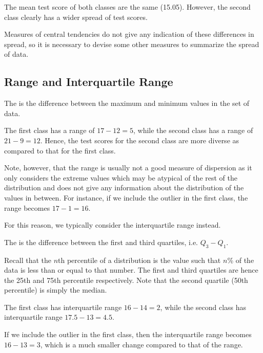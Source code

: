 The mean test score of both classes are the same (15.05). However, the second class clearly has a wider spread of test scores.

Measures of central tendencies do not give any indication of these differences in spread, so it is necessary to devise some other measures to summarize the spread of data.

\subsection{Range and Interquartile Range}

\begin{definition}
    The  is the difference between the maximum and minimum values in the set of data.
\end{definition}

\begin{example}[Range]
    The first class has a range of $17 - 12 = 5$, while the second class has a range of $21 - 9 = 12$. Hence, the test scores for the second class are more diverse as compared to that for the first class.
\end{example}

Note, however, that the range is usually not a good measure of dispersion as it only considers the extreme values which may be atypical of the rest of the distribution and does not give any information about the distribution of the values in between. For instance, if we include the outlier in the first class, the range becomes $17 - 1 = 16$.

For this reason, we typically consider the interquartile range instead.

\begin{definition}
    The  is the difference between the first and third quartiles, i.e. $Q_3 - Q_1$.
\end{definition}

Recall that the $n$th percentile of a distribution is the value such that $n$\% of the data is less than or equal to that number. The first and third quartiles are hence the 25th and 75th percentile respectively. Note that the second quartile (50th percentile) is simply the median.

\begin{example}
    The first class has interquartile range $16 - 14 = 2$, while the second class has interquartile range $17.5 - 13 = 4.5$.
    
    If we include the outlier in the first class, then the interquartile range becomes $16 - 13 = 3$, which is a much smaller change compared to that of the range.
\end{example}

